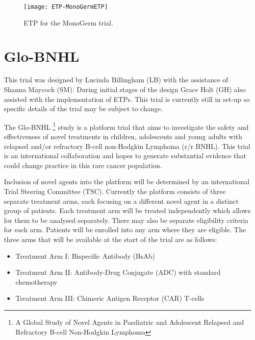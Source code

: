 \begin{sidewaysfigure}[h!]
	\centering
	\caption{ETP for the MonoGerm trial.}
	\label{fig_etp:MonoGermETP}
	\texttt{[image: ETP-MonoGermETP]}
\end{sidewaysfigure} 

\clearpage


\section{Glo-BNHL}

This trial was designed by Lucinda Billingham (LB) with the assistance of Shanna Maycock (SM). During initial stages of the design Grace Holt (GH) also assisted with the implementation of ETPs. This trial is currently still in set-up so specific details of the trial may be subject to change.   

The Glo-BNHL \footnote{A Global Study of Novel Agents in Paediatric and Adolescent Relapsed and Refractory B-cell Non-Hodgkin Lymphoma} study is a platform trial that aims to investigate the safety and effectiveness of novel treatments in children, adolescents and young adults with relapsed and/or refractory B-cell non-Hodgkin Lymphoma (r/r BNHL). This trial is an international collaboration and hopes to generate substantial evidence that could change practice in this rare cancer population. 

Inclusion of novel agents into the platform will be determined by an international Trial Steering Committee (TSC). Currently the platform consists of three separate treatment arms, each focusing on a different novel agent in a distinct group of patients. Each treatment arm will be treated independently which allows for them to be analysed separately. There may also be separate eligibility criteria for each arm. Patients will be enrolled into any arm where they are eligible. The three arms that will be available at the start of the trial are as follows: 

\begin{itemize}
	\item Treatment Arm \RN{1}: Bispecific Antibody (BsAb)
	\item Treatment Arm \RN{2}: Antibody-Drug Conjugate (ADC) with standard \\ chemotherapy
	\item Treatment Arm \RN{3}: Chimeric Antigen Receptor (CAR) T-cells
\end{itemize}

